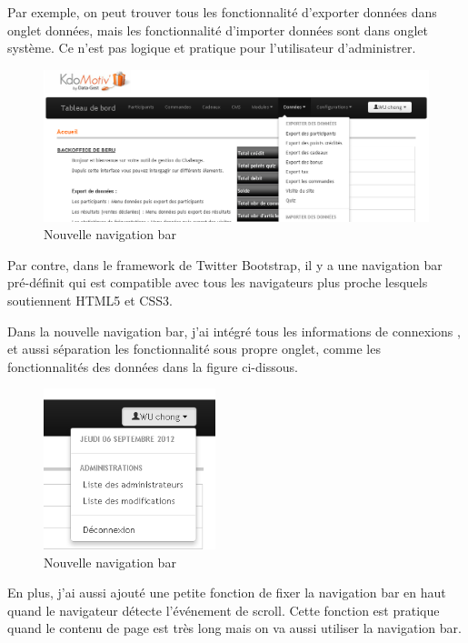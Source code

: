 Par exemple, on peut trouver tous les fonctionnalité d'exporter données dans onglet données, mais les fonctionnalité d'importer données sont dans onglet système. Ce n'est pas logique et pratique pour l'utilisateur d'administrer.



 \begin{figure}[hbtp]
\centering
\includegraphics[width=15cm]{body/images/navbar-new.png}
\caption{Nouvelle navigation bar}
\end{figure}

Par contre, dans le framework de Twitter Bootstrap, il y a une navigation bar pré-définit qui est compatible avec tous les navigateurs plus proche lesquels soutiennent HTML5 et CSS3.

Dans la nouvelle navigation bar, j'ai intégré tous les informations de connexions , et aussi séparation les fonctionnalité sous propre onglet, comme les fonctionnalités des données dans la figure ci-dissous. 

 \begin{figure}[hbtp]
\centering
\includegraphics[width=5cm]{body/images/info-connexion.png}
\caption{Nouvelle navigation bar}
\end{figure}

En plus, j'ai aussi ajouté une petite fonction de fixer la navigation bar en haut quand le navigateur détecte l'événement de scroll. Cette fonction est pratique quand le contenu de page est très long mais on va aussi utiliser la navigation bar.

